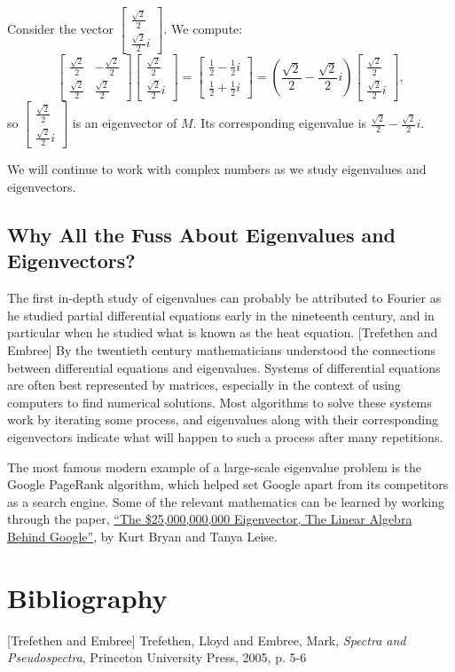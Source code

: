 \documentclass{ximera}
\begin{document}
\begin{example}
Consider the vector $\begin{bmatrix} \frac{\sqrt{2}}{2}\\ \frac{\sqrt{2}}{2} i \end{bmatrix}$.  We compute:
$$\begin{bmatrix}
\frac{\sqrt{2}}{2} & -\frac{\sqrt{2}}{2}\\
\frac{\sqrt{2}}{2} & \frac{\sqrt{2}}{2}
\end{bmatrix} \begin{bmatrix} \frac{\sqrt{2}}{2}\\ \frac{\sqrt{2}}{2} i \end{bmatrix} =
\begin{bmatrix} \frac{1}{2}-\frac{1}{2} i\\ \frac{1}{2}+ \frac{1}{2} i \end{bmatrix}= (\frac{\sqrt{2}}{2}-\frac{\sqrt{2}}{2}i) \begin{bmatrix} \frac{\sqrt{2}}{2}\\ \frac{\sqrt{2}}{2} i \end{bmatrix},$$
so $\begin{bmatrix} \frac{\sqrt{2}}{2}\\ \frac{\sqrt{2}}{2} i \end{bmatrix}$ is an eigenvector of $M$.  Its corresponding eigenvalue is $\frac{\sqrt{2}}{2}-\frac{\sqrt{2}}{2}i$.
\end{example}
    
We will continue to work with complex numbers as we study eigenvalues and eigenvectors.
    
\subsection*{Why All the Fuss About Eigenvalues and Eigenvectors?}
    
\begin{remark}
The first in-depth study of eigenvalues can probably be attributed to Fourier as he studied partial differential equations early in the nineteenth century, and in particular when he studied what is known as the heat equation. [Trefethen and  Embree]  By the twentieth century mathematicians understood the connections between differential equations and eigenvalues. Systems of differential equations are often best represented by matrices, especially in the context of using computers to find numerical solutions. Most algorithms to solve these systems work by iterating some process, and eigenvalues along with their corresponding eigenvectors indicate what will happen to such a process after many repetitions.
    
The most famous modern example of a large-scale eigenvalue problem is the Google PageRank algorithm, which helped set Google apart from its competitors as a search engine.  Some of the relevant mathematics can be learned by working through the paper, \href{https://doi.org/10.1137/050623280}{``The \$25,000,000,000 Eigenvector, The Linear Algebra Behind Google''}, by Kurt Bryan and Tanya Leise. 
\end{remark}

    
\section*{Bibliography}
[Trefethen and  Embree] Trefethen, Lloyd and Embree, Mark, {\it Spectra and Pseudospectra}, Princeton University Press, 2005, p. 5-6
\end{document}
